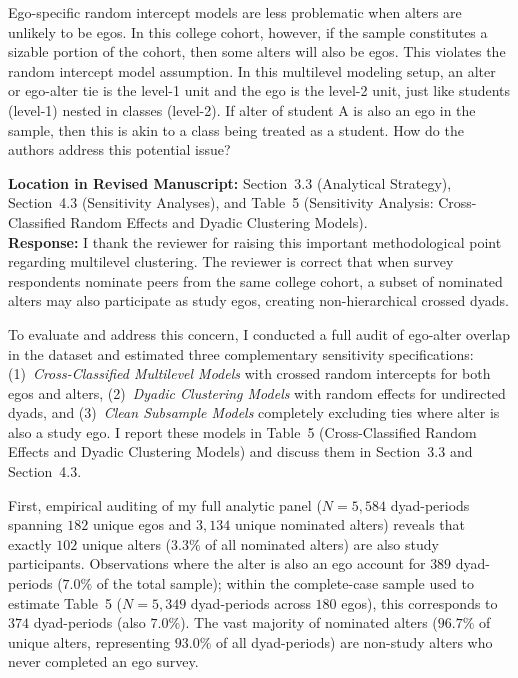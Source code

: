 \documentclass[11pt]{article}
\begin{document}
\begin{reviewercomment}
Ego-specific random intercept models are less problematic when alters are unlikely to be egos. In this college cohort, however, if the sample constitutes a sizable portion of the cohort, then some alters will also be egos. This violates the random intercept model assumption. In this multilevel modeling setup, an alter or ego-alter tie is the level-1 unit and the ego is the level-2 unit, just like students (level-1) nested in classes (level-2). If alter of student A is also an ego in the sample, then this is akin to a class being treated as a student. How do the authors address this potential issue?
\end{reviewercomment}

\noindent\textbf{Location in Revised Manuscript:} Section~3.3 (Analytical Strategy), Section~4.3 (Sensitivity Analyses), and Table~5 (Sensitivity Analysis: Cross-Classified Random Effects and Dyadic Clustering Models).\\[4pt]
\textbf{Response:} I thank the reviewer for raising this important methodological point regarding multilevel clustering. The reviewer is correct that when survey respondents nominate peers from the same college cohort, a subset of nominated alters may also participate as study egos, creating non-hierarchical crossed dyads.

To evaluate and address this concern, I conducted a full audit of ego-alter overlap in the dataset and estimated three complementary sensitivity specifications: (1)~\textit{Cross-Classified Multilevel Models} with crossed random intercepts for both egos and alters, (2)~\textit{Dyadic Clustering Models} with random effects for undirected dyads, and (3)~\textit{Clean Subsample Models} completely excluding ties where alter is also a study ego. I report these models in Table~5 (Cross-Classified Random Effects and Dyadic Clustering Models) and discuss them in Section~3.3 and Section~4.3.

First, empirical auditing of my full analytic panel ($N = 5,584$ dyad-periods spanning $182$ unique egos and $3,134$ unique nominated alters) reveals that exactly $102$ unique alters ($3.3\%$ of all nominated alters) are also study participants. Observations where the alter is also an ego account for $389$ dyad-periods ($7.0\%$ of the total sample); within the complete-case sample used to estimate Table~5 ($N = 5,349$ dyad-periods across $180$ egos), this corresponds to $374$ dyad-periods (also $7.0\%$). The vast majority of nominated alters ($96.7\%$ of unique alters, representing $93.0\%$ of all dyad-periods) are non-study alters who never completed an ego survey.
\end{document}
